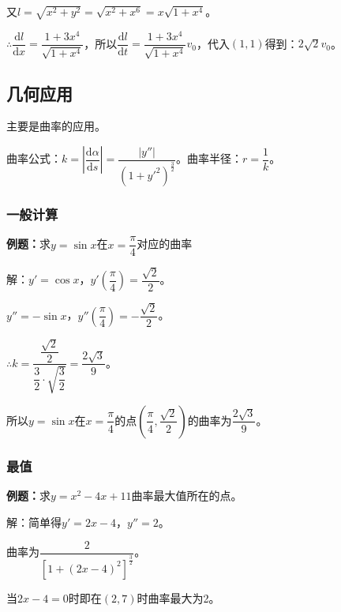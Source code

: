 \documentclass[UTF8, 12pt]{ctexart}
\begin{document}
又$l=\sqrt{x^2+y^2}=\sqrt{x^2+x^6}=x\sqrt{1+x^4}$。

$\therefore\dfrac{\textrm{d}l}{\textrm{d}x}=\dfrac{1+3x^4}{\sqrt{1+x^4}}$，所以$\dfrac{\textrm{d}l}{\textrm{d}t}=\dfrac{1+3x^4}{\sqrt{1+x^4}}v_0$，代入$(1,1)$得到：$2\sqrt{2}v_0$。

\subsection{几何应用}

主要是曲率的应用。

曲率公式：$k=\left\lvert\dfrac{\textrm{d}\alpha}{\textrm{d}s}\right\rvert=\dfrac{\vert y''\vert}{(1+y'^2)^{\frac{3}{2}}}$。曲率半径：$r=\dfrac{1}{k}$。

\subsubsection{一般计算}

\textbf{例题：}求$y=\sin x$在$x=\dfrac{\pi}{4}$对应的曲率

解：$y'=\cos x$，$y'(\dfrac{\pi}{4})=\dfrac{\sqrt{2}}{2}$。

$y''=-\sin x$，$y''(\dfrac{\pi}{4})=-\dfrac{\sqrt{2}}{2}$。

$\therefore k=\dfrac{\dfrac{\sqrt{2}}{2}}{\dfrac{3}{2}\cdot\sqrt{\dfrac{3}{2}}}=\dfrac{2\sqrt{3}}{9}$。

所以$y=\sin x$在$x=\dfrac{\pi}{4}$的点$(\dfrac{\pi}{4},\dfrac{\sqrt{2}}{2})$的曲率为$\dfrac{2\sqrt{3}}{9}$。

\subsubsection{最值}

\textbf{例题：}求$y=x^2-4x+11$曲率最大值所在的点。

解：简单得$y'=2x-4$，$y''=2$。

曲率为$\dfrac{2}{[1+(2x-4)^2]^{\frac{3}{2}}}$。

当$2x-4=0$时即在$(2,7)$时曲率最大为2。
\end{document}
